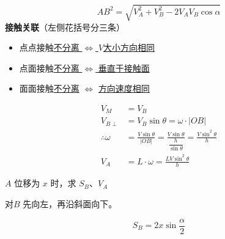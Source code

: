 \[
AB^{2}=\sqrt{V_A^{2}+V_B^{2}-2V_AV_B\cos\alpha}
\]%
\textbf{接触关联}（左侧花括号分三条）
\begin{itemize}
\item 点点接触\quad \underline{不分离 $\Leftrightarrow$ $V$大小方向相同}
\item 点面接触\quad \underline{不分离 $\Leftrightarrow$ 垂直于接触面}%
\item 面面接触\quad \underline{不分离} $\Leftrightarrow$ \underline{方向速度相同}
\end{itemize}
\begin{align*}
V_M&=V_B\\
V_{B\perp}&=V_B\sin\theta=\omega\cdot|OB|\\
\therefore\omega&=\frac{V\sin\theta}{|OB|}=\frac{V\sin\theta}{\dfrac{h}{\sin\theta}}=\frac{V\sin^{2}\theta}{h}\\
V_A&=L\cdot\omega=\frac{LV\sin^{2}\theta}{h}
\end{align*}%

\noindent $A$ 位移为 $x$ 时，求 $S_B$、$V_A$

\noindent 对$B$ 先向左，再沿斜面向下。

\[
S_B=2x\sin\frac{\alpha}{2}
\]

